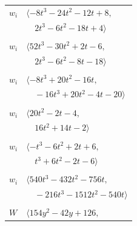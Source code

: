 \documentclass[11pt]{article}
\begin{document}
\begin{longtable}{@{}ll@{}}
$w_i$ & $\langle -8t^{3}-24t^{2}-12t+8,$\\
 & $\quad 2t^{3}-6t^{2}-18t+4\rangle$\\
\addlinespace[2pt]
\multicolumn{2}{@{}p{0.97\textwidth}@{}}{$i=66$, $D_i=1$, $\rho_{ij}$: $4{:}1, \allowbreak 10{:}1, \allowbreak 17{:}2, \allowbreak 19{:}1, \allowbreak 27{:}1, \allowbreak 29{:}1, \allowbreak 36{:}1, \allowbreak 47{:}1, \allowbreak 53{:}2, \allowbreak 60{:}1, \allowbreak 68{:}1$}\\
$w_i$ & $\langle 52t^{3}-30t^{2}+2t-6,$\\
 & $\quad 2t^{3}-6t^{2}-8t-18\rangle$\\
\addlinespace[2pt]
\multicolumn{2}{@{}p{0.97\textwidth}@{}}{$i=67$, $D_i=4$, $\rho_{ij}$: $4{:}1, \allowbreak 11{:}2, \allowbreak 14{:}1, \allowbreak 20{:}2, \allowbreak 35{:}2, \allowbreak 42{:}2, \allowbreak 57{:}2$}\\
$w_i$ & $\langle -8t^{3}+20t^{2}-16t,$\\
 & $\quad -16t^{3}+20t^{2}-4t-20\rangle$\\
\addlinespace[2pt]
\multicolumn{2}{@{}p{0.97\textwidth}@{}}{$i=68$, $D_i=2$, $\rho_{ij}$: $19{:}2, \allowbreak 47{:}1, \allowbreak 51{:}1, \allowbreak 60{:}2, \allowbreak 66{:}2$}\\
$w_i$ & $\langle 20t^{2}-2t-4,$\\
 & $\quad 16t^{2}+14t-2\rangle$\\
\addlinespace[2pt]
\multicolumn{2}{@{}p{0.97\textwidth}@{}}{$i=69$, $D_i=2$, $\rho_{ij}$: $25{:}2, \allowbreak 33{:}2, \allowbreak 34{:}1, \allowbreak 40{:}2, \allowbreak 65{:}2$}\\
$w_i$ & $\langle -t^{3}-6t^{2}+2t+6,$\\
 & $\quad t^{3}+6t^{2}-2t-6\rangle$\\
\addlinespace[2pt]
\multicolumn{2}{@{}p{0.97\textwidth}@{}}{$i=70$, $D_i=18$, $e_i=2$, $\rho_{ij}$: $22{:}2, \allowbreak 27{:}1, \allowbreak 30{:}2, \allowbreak 39{:}2$}\\
$w_i$ & $\langle 540t^{3}-432t^{2}-756t,$\\
 & $\quad -216t^{3}-1512t^{2}-540t\rangle$\\
\addlinespace[2pt]
\multicolumn{2}{@{}p{0.97\textwidth}@{}}{$i=71$, $D_i=16$, $\rho_{ij}$: $13{:}2, \allowbreak 14{:}2, \allowbreak 19{:}2, \allowbreak 21{:}1, \allowbreak 45{:}1, \allowbreak 48{:}2, \allowbreak 61{:}1, \allowbreak 62{:}2, \allowbreak 63{:}1$}\\
$W$ & $\langle 154y^{2}-42y+126,$\\

\end{longtable}
\end{document}
